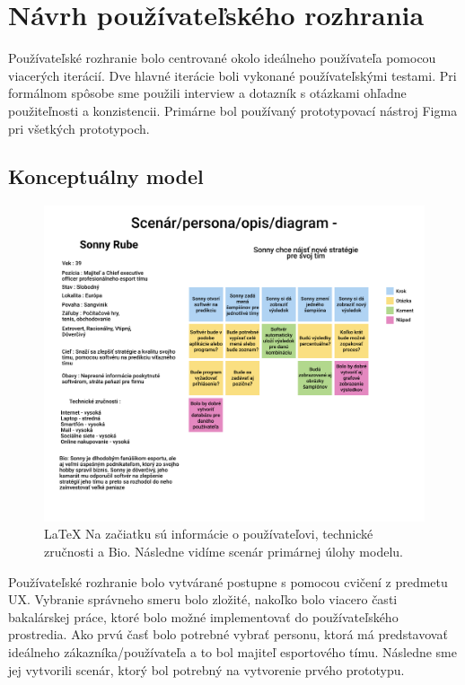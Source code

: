 \chapter{Návrh používateľského rozhrania}

\label{summary}

Používateľské rozhranie bolo centrované okolo ideálneho používateľa pomocou viacerých iterácií. Dve hlavné iterácie boli vykonané používateľskými testami. Pri formálnom spôsobe sme použili interview a dotazník s otázkami ohľadne použiteľnosti a konzistencii. Primárne bol používaný prototypovací nástroj Figma pri všetkých prototypoch.



\section*{Konceptuálny model}



\begin{figure}[h!]
	
	\includegraphics[width=.9\textwidth]{figures/scenar}
	
	\centering
	
	\caption{\LaTeX{} Na začiatku sú informácie o používateľovi, technické zručnosti a Bio. Následne vidíme scenár primárnej úlohy modelu. \label{scenar}}
	
\end{figure}



Používateľské rozhranie bolo vytvárané postupne s pomocou cvičení z predmetu UX. Vybranie správneho smeru bolo zložité, nakoľko bolo viacero časti bakalárskej práce, ktoré bolo možné implementovať do používateľského prostredia. Ako prvú časť bolo potrebné vybrať personu, ktorá má predstavovať ideálneho zákazníka/používateľa a to bol majiteľ esportového tímu. Následne sme jej vytvorili scenár, ktorý bol potrebný na vytvorenie prvého prototypu. 



